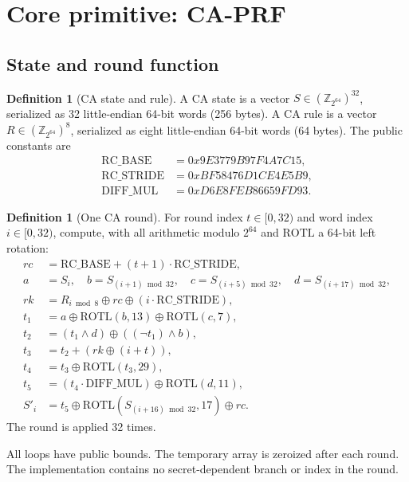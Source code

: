 \documentclass[11pt,a4paper]{article}
\theoremstyle{plain}
\theoremstyle{definition}
\newtheorem{definition}[theorem]{Definition}
\theoremstyle{remark}
\newcommand{\Z}{\mathbb{Z}}
\begin{document}
\section{Core primitive: CA-PRF}
\label{sec:caprf}

\subsection{State and round function}

\begin{definition}[CA state and rule]
A CA state is a vector $S\in(\Z_{2^{64}})^{32}$, serialized as 32
little-endian 64-bit words (256 bytes).  A CA rule is a vector
$R\in(\Z_{2^{64}})^8$, serialized as eight little-endian 64-bit words
(64 bytes).  The public constants are
\[
 \begin{aligned}
 \mathrm{RC\_BASE}&=0x9E3779B97F4A7C15,\\
 \mathrm{RC\_STRIDE}&=0xBF58476D1CE4E5B9,\\
 \mathrm{DIFF\_MUL}&=0xD6E8FEB86659FD93.
 \end{aligned}
\]
\end{definition}

\begin{definition}[One CA round]
For round index $t\in[0,32)$ and word index $i\in[0,32)$, compute, with
all arithmetic modulo $2^{64}$ and $\mathrm{ROTL}$ a 64-bit left
rotation:
\[
\begin{aligned}
 rc &= \mathrm{RC\_BASE}+(t+1)\cdot\mathrm{RC\_STRIDE},\\
 a &= S_i,\quad b=S_{(i+1)\bmod 32},\quad
 c=S_{(i+5)\bmod 32},\quad d=S_{(i+17)\bmod 32},\\
 rk &= R_{i\bmod 8}\oplus rc\oplus
       (i\cdot\mathrm{RC\_STRIDE}),\\
 t_1 &= a\oplus\mathrm{ROTL}(b,13)\oplus\mathrm{ROTL}(c,7),\\
 t_2 &= (t_1\land d)\oplus((\lnot t_1)\land b),\\
 t_3 &= t_2+(rk\oplus(i+t)),\\
 t_4 &= t_3\oplus\mathrm{ROTL}(t_3,29),\\
 t_5 &= (t_4\cdot\mathrm{DIFF\_MUL})\oplus\mathrm{ROTL}(d,11),\\
 S'_i &= t_5\oplus\mathrm{ROTL}(S_{(i+16)\bmod 32},17)\oplus rc.
\end{aligned}
\]
The round is applied 32 times.
\end{definition}

All loops have public bounds.  The temporary array is zeroized after
each round.  The implementation contains no secret-dependent branch or
index in the round.
\end{document}
